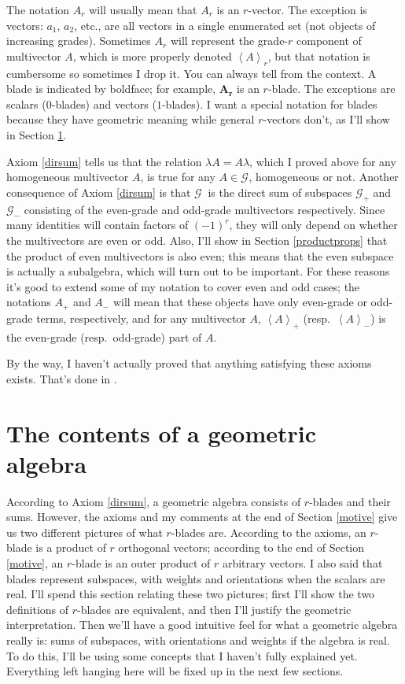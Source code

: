 \documentclass{utarticle}
\newcommand{\G}[1][]{\ensuremath{\mathcal{G}_{#1}}}
\newcommand{\bl}[1]{\ensuremath{\bm{#1}}}
\newcommand{\grade}[2][]{\ensuremath{\left\langle #2 \right\rangle_{#1}}}
\begin{document}
The notation $A_r$ will usually mean that $A_r$ is an $r$-vector.  The
exception is vectors: $a_1$, $a_2$, etc., are all vectors in a single
enumerated set (not objects of increasing grades).  Sometimes $A_r$ will
represent the grade-$r$ component of multivector $A$, which
is more properly denoted $\grade[r]{A}$, but that notation is cumbersome
so sometimes I drop it.  You can always tell from the context.  A blade is 
indicated by boldface; for example, \bl{A_r} is an $r$-blade.  The exceptions
are scalars ($0$-blades) and vectors ($1$-blades).  I want a special
notation for blades because they have geometric meaning while general 
$r$-vectors don't, as I'll show in Section \ref{whatshere}.

Axiom \ref{dirsum} tells us that the relation 
$\lambda A = A \lambda$, which I proved above for any homogeneous
multivector $A$, is true for any $A \in \G$, homogeneous or not.  
Another consequence of Axiom \ref{dirsum} is that \G\ is the
direct sum of subspaces \G[+] and \G[-] consisting of the even-grade
and odd-grade multivectors respectively.  Since many identities will
contain factors of $(-1)^r$, they will only depend on
whether the multivectors are even or odd.  Also, I'll show in
Section \ref{productprops} that the product of even multivectors is also even; this
means that the even subspace is actually a subalgebra, which will turn 
out to be important.  For these reasons
it's good to extend some of my notation to cover even and odd cases;
the notations $A_+$ and $A_-$ will mean that these objects have only
even-grade or odd-grade terms, respectively, and for any multivector
$A$, \grade[+]{A} (resp.\ \grade[-]{A}) is the 
even-grade (resp.\ odd-grade) part of $A$.

By the way, I haven't actually proved that anything satisfying these axioms exists.
That's done in \cite{elementary}.

\section{The contents of a geometric algebra}
\label{whatshere}

According to Axiom \ref{dirsum}, a geometric algebra consists of $r$-blades and their
sums.  However, the axioms and my comments at the end of Section \ref{motive} give 
us two different pictures of what $r$-blades are.  According to the axioms, an $r$-blade 
is a product of $r$ orthogonal vectors; according to the end of Section \ref{motive}, 
an $r$-blade is an outer product of $r$ arbitrary vectors.  I also said that blades represent 
subspaces, with weights and orientations when the scalars are real.  I'll spend this section 
relating these two pictures; first I'll show the two definitions of $r$-blades are equivalent, 
and then I'll justify the geometric interpretation.  Then we'll have a good intuitive 
feel for what a geometric algebra really is: sums of subspaces, with orientations and 
weights if the algebra is real.  To do this, I'll be using some concepts that I haven't fully 
explained yet.  Everything left hanging here will be fixed up in the next few sections.
\end{document}
